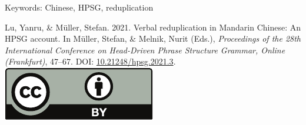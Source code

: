\documentclass[11pt,a4paper,fleqn]{article}
\begin{document}
\noindent
Keywords: Chinese, HPSG, reduplication


\vfill
\noindent
Lu, Yanru, \& Müller, Stefan. 2021. Verbal reduplication in Mandarin Chinese: An HPSG account. In Müller, Stefan, \& Melnik, Nurit (Eds.), \emph{{Proceedings of the 28th International Conference on Head-Driven Phrase Structure Grammar, Online (Frankfurt)}},
47--67. DOI: \href{http://doi.org/10.21248/hpsg.2021.3}{10.21248/hpsg.2021.3}. \hfill\href{http://creativecommons.org/licenses/by/4.0/}{\includegraphics[height=.75em]{Includes/ccby-eps-converted-to.pdf}}

\newpage

\end{document}
